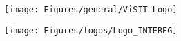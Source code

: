 \documentclass[
10pt, %
a4paper, %
oneside, %
headinclude,footinclude, %
BCOR5mm, %
]{scrartcl}
\title{\normalfont\spacedallcaps{ViSIT - Technische Dokumentation}} %
\author{Emanuel Berndl\textsuperscript{1} \& \\ Robert Kathrein\textsuperscript{2} \& Kris Raich\textsuperscript{2} \& \\ Florian Schlenker\textsuperscript{3}} %
\date{\today} %
\begin{document}

\renewcommand{\sectionmark}[1]{\markright{\spacedlowsmallcaps{#1}}} %
\lehead{\mbox{\llap{\small\thepage\kern1em\color{halfgray} \vline}\color{halfgray}\hspace{0.5em}\rightmark\hfil}} %

\pagestyle{scrheadings} %


\maketitle %

\setcounter{tocdepth}{2} %

\begin{figure}[htb]
    \centering
    \texttt{[image: Figures/general/ViSIT\_Logo]}
\end{figure}

\begin{figure}[htb]
    \centering
    \texttt{[image: Figures/logos/Logo\_INTEREG]}
\end{figure}

\newpage

\tableofcontents %

\listoffigures %

\listoftables %


\end{document}
